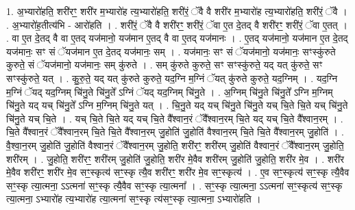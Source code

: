 \documentclass[17pt]{extarticle}
\begin{document}
1. अ॒भ्यारो॑हति॒ शरी॑रꣳ॒॒ शरी॑र म॒भ्यारो॑ह त्य॒भ्यारो॑हति॒ शरी॑रं॒ ॅवै वै शरी॑र म॒भ्यारो॑ह
त्य॒भ्यारो॑हति॒ शरी॑रं॒ ॅवै । . अ॒भ्यारो॑ह॒तीत्य॑भि - आरो॑हति । . शरी॑रं॒ ॅवै वै शरी॑रꣳ॒॒ शरी॑रं॒ ॅवा ए॒त दे॒तद् वै शरी॑रꣳ॒॒ शरी॑रं॒ ॅवा ए॒तत् । . वा ए॒त दे॒तद् वै वा ए॒तद् यज॑मानो॒ यज॑मान ए॒तद् वै वा ए॒तद् यज॑मानः । . ए॒तद् यज॑मानो॒ यज॑मान ए॒त दे॒तद् यज॑मानः॒ सꣳ सं ॅयज॑मान ए॒त दे॒तद् यज॑मानः॒ सम् । . यज॑मानः॒ सꣳ सं ॅयज॑मानो॒ यज॑मानः॒ सꣳस्कु॑रुते कुरुते॒ सं ॅयज॑मानो॒ यज॑मानः॒ सम् कु॑रुते । . सम् कु॑रुते कुरुते॒ सꣳ सꣳस्कु॑रुते॒ यद् यत् कु॑रुते॒ सꣳ सꣳस्कु॑रुते॒ यत् । . कु॒रु॒ते॒ यद् यत् कु॑रुते कुरुते॒ यद॒ग्नि म॒ग्निं ॅयत् कु॑रुते कुरुते॒ यद॒ग्निम् । . यद॒ग्नि म॒ग्निं ॅयद् यद॒ग्निम् चि॑नु॒ते चि॑नु॒ते᳚ ऽग्निं ॅयद् यद॒ग्निम् चि॑नु॒ते । . अ॒ग्निम् चि॑नु॒ते चि॑नु॒ते᳚ ऽग्नि म॒ग्निम् चि॑नु॒ते यद् यच् चि॑नु॒ते᳚ ऽग्नि म॒ग्निम् चि॑नु॒ते यत् । . चि॒नु॒ते यद् यच् चि॑नु॒ते चि॑नु॒ते यच् चि॒ते चि॒ते यच् चि॑नु॒ते चि॑नु॒ते यच् चि॒ते । . यच् चि॒ते चि॒ते यद् यच् चि॒ते वै᳚श्वान॒रं ॅवै᳚श्वान॒रम् चि॒ते यद् यच् चि॒ते वै᳚श्वान॒रम् । . चि॒ते वै᳚श्वान॒रं ॅवै᳚श्वान॒रम् चि॒ते चि॒ते वै᳚श्वान॒रम् जु॒होति॑ जु॒होति॑ वैश्वान॒रम् चि॒ते चि॒ते वै᳚श्वान॒रम् जु॒होति॑ । . वै॒श्वा॒न॒रम् जु॒होति॑ जु॒होति॑ वैश्वान॒रं ॅवै᳚श्वान॒रम् जु॒होति॒ शरी॑रꣳ॒॒ शरी॑रम् जु॒होति॑ वैश्वान॒रं ॅवै᳚श्वान॒रम् जु॒होति॒ शरी॑रम् । . जु॒होति॒ शरी॑रꣳ॒॒ शरी॑रम् जु॒होति॑ जु॒होति॒ शरी॑र मे॒वैव शरी॑रम् जु॒होति॑ जु॒होति॒ शरी॑र मे॒व । . शरी॑र मे॒वैव शरी॑रꣳ॒॒ शरी॑र मे॒व सꣳ॒॒स्कृत्य॑ सꣳ॒॒स्कृ त्यै॒व शरी॑रꣳ॒॒ शरी॑र मे॒व सꣳ॒॒स्कृत्य॑ । . ए॒व सꣳ॒॒स्कृत्य॑ सꣳ॒॒स्कृ त्यै॒वैव सꣳ॒॒स्कृ त्या॒त्मना॒ ऽऽत्मना॑ सꣳ॒॒स्कृ त्यै॒वैव 
सꣳ॒॒स्कृ त्या॒त्मना᳚ । . सꣳ॒॒स्कृ त्या॒त्मना॒ ऽऽत्मना॑ सꣳ॒॒स्कृत्य॑ सꣳ॒॒स्कृ त्या॒त्मना॒ ऽभ्यारो॑ह त्य॒भ्यारो॑ह त्या॒त्मना॑ सꣳ॒॒स्कृ त्य॑सꣳ॒॒स्कृ त्या॒त्मना॒ ऽभ्यारो॑हति । \newline
\end{document}
